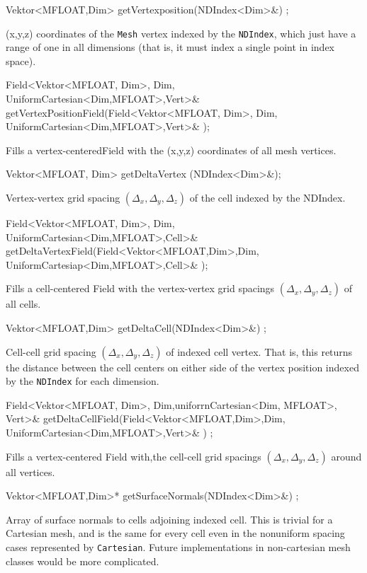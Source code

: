 \begin{smallcode}
Vektor<MFLOAT,Dim> getVertexposition(NDIndex<Dim>&) ;
\end{smallcode}
(x,y,z) coordinates of the \texttt{Mesh} vertex indexed by the \texttt{NDIndex}, which just have a range of one in all dimensions (that is, it must index a single point in index space). 

\begin{smallcode}
Field<Vektor<MFLOAT, Dim>, Dim, UniformCartesian<Dim,MFLOAT>,Vert>& 
getVertexPositionField(Field<Vektor<MFLOAT, Dim>, Dim, UniformCartesian<Dim,MFLOAT>,Vert>& );
\end{smallcode}
Fills a vertex-centeredField with the (x,y,z) coordinates of all mesh vertices. 

\begin{smallcode}
Vektor<MFLOAT, Dim> getDeltaVertex (NDIndex<Dim>&); 
\end{smallcode}
Vertex-vertex grid spacing $(\Delta_x, \Delta_y, \Delta_z)$ of the cell indexed by the NDIndex. 

\begin{smallcode}
Field<Vektor<MFLOAT, Dim>, Dim, UniformCartesian<Dim,MFLOAT>,Cell>& 
getDeltaVertexField(Field<Vektor<MFLOAT,Dim>,Dim, UniformCartesiap<Dim,MFLOAT>,Cell>& );
\end{smallcode}
Fills a cell-centered Field with the vertex-vertex grid spacings $(\Delta_x, \Delta_y, \Delta_z)$  of all cells. 

\begin{smallcode}
Vektor<MFLOAT,Dim> getDeltaCell(NDIndex<Dim>&) ;
\end{smallcode}
Cell-cell grid spacing $(\Delta_x, \Delta_y, \Delta_z)$ of indexed cell vertex. That is, this returns the distance between the cell centers on either side of the vertex position indexed by the \texttt{NDIndex} for each dimension. 

\begin{smallcode}
Field<Vektor<MFLOAT, Dim>, Dim,uniforrnCartesian<Dim, MFLOAT>, Vert>& 
getDeltaCellField(Field<Vektor<MFLOAT,Dim>,Dim, UniformCartesian<Dim,MFLOAT>,Vert>& ) ;
\end{smallcode}
Fills a vertex-centered Field with,the cell-cell grid spacings $(\Delta_x, \Delta_y, \Delta_z)$ around all vertices. 

\begin{smallcode}
Vektor<MFLOAT,Dim>* getSurfaceNormals(NDIndex<Dim>&) ;
\end{smallcode}
Array of surface normals to cells adjoining indexed cell. This is trivial for a Cartesian mesh, and is the same for every cell even in the nonuniform spacing cases represented by \texttt{Cartesian}. 
Future implementations in non-cartesian mesh classes would be more complicated. 

